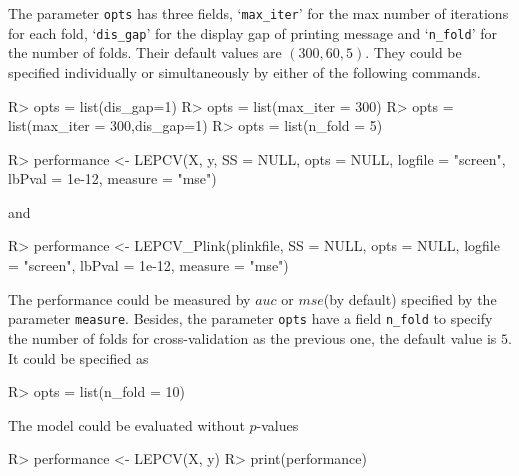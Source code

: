 \documentclass[11pt]{article}
\begin{document}
The parameter \texttt{opts} has three fields, `\texttt{max\_iter}' for the max number of iterations for each fold, `\texttt{dis\_gap}' for the display gap of printing message and `\texttt{n\_fold}' for the number of folds. Their default values are $(300,60,5)$. They could be specified individually or simultaneously by either of the following commands.
\begin{Schunk}
\begin{Sinput}
R> opts = list(dis_gap=1)
R> opts = list(max_iter = 300)
R> opts = list(max_iter = 300,dis_gap=1)
R> opts = list(n_fold = 5)
\end{Sinput}
\end{Schunk}

\begin{Schunk}
\begin{Sinput}
R> performance <- LEPCV(X, y, SS = NULL, opts = NULL, logfile = "screen", lbPval = 1e-12,
                                                                         measure = "mse")
\end{Sinput}
\end{Schunk}

and

\begin{Schunk}
\begin{Sinput}
R> performance <- LEPCV_Plink(plinkfile, SS = NULL, opts = NULL, logfile = "screen",
                                                         lbPval = 1e-12, measure = "mse")
\end{Sinput}
\end{Schunk}

The performance could be measured by $auc$ or $mse$(by default) specified by the parameter \texttt{measure}. Besides, the parameter \texttt{opts} have a field \texttt{n\_fold} to specify the number of folds for cross-validation as the previous one, the default value is $5$. It could be specified as
\begin{Schunk}
\begin{Sinput}
R> opts = list(n_fold = 10)
\end{Sinput}
\end{Schunk}

The model could be evaluated without $p$-values
\begin{Schunk}
\begin{Sinput}
R>   performance <- LEPCV(X, y)
R>   print(performance)
\end{Sinput}
\end{Schunk}
\end{document}
